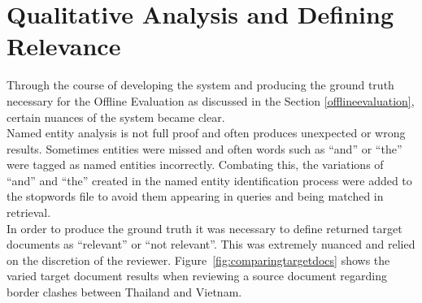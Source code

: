 \documentclass{l4proj}
\begin{document}
\section{Qualitative Analysis and Defining Relevance} \label{qualitativeanalysis}
Through the course of developing the system and producing the ground truth necessary for the Offline Evaluation as discussed in the Section \ref{offlineevaluation}, certain nuances of the system became clear. \\
Named entity analysis is not full proof and often produces unexpected or wrong results. Sometimes entities were missed and often words such as ``and'' or ``the'' were tagged as named entities incorrectly. Combating this, the variations of ``and'' and ``the'' created in the named entity identification process were added to the stopwords file to avoid them appearing in queries and being matched in retrieval. \\
In order to produce the ground truth it was necessary to define returned target documents as ``relevant'' or ``not relevant''. This was extremely nuanced and relied on the discretion of the reviewer. Figure~\ref{fig:comparingtargetdocs} shows the varied target document results when reviewing a source document regarding border clashes between Thailand and Vietnam.
\end{document}
